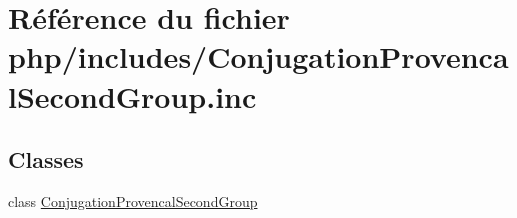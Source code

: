 \hypertarget{_conjugation_provencal_second_group_8inc}{}\section{Référence du fichier php/includes/\+Conjugation\+Provencal\+Second\+Group.inc}
\label{_conjugation_provencal_second_group_8inc}
\subsection*{Classes}
\begin{DoxyCompactItemize}
\item 
class \hyperlink{class_conjugation_provencal_second_group}{Conjugation\+Provencal\+Second\+Group}
\end{DoxyCompactItemize}
